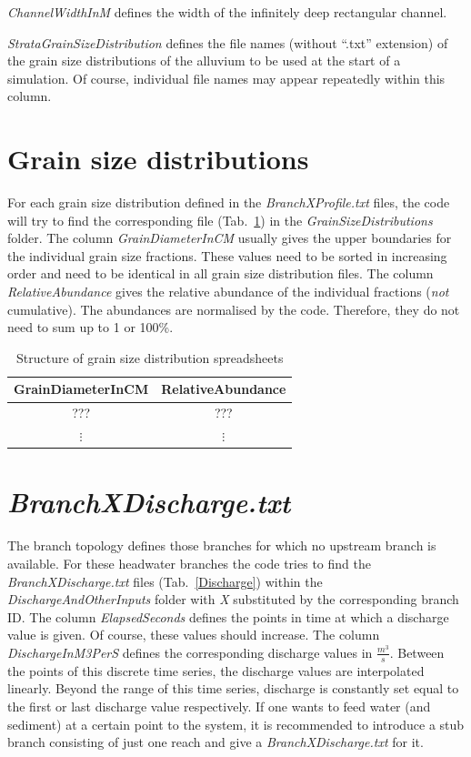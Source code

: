 \documentclass[11pt,a4paper]{article}
\begin{document}
\emph{ChannelWidthInM} defines the width of the infinitely deep rectangular channel.

\emph{StrataGrainSizeDistribution} defines the file names (without ``.txt'' extension) of the grain size distributions of the alluvium to be used at the start of a simulation. Of course, individual file names may appear repeatedly within this column.

\section{Grain size distributions}\label{GrainSizeDistributions}
For each grain size distribution defined in the \emph{BranchXProfile.txt} files, the code will try to find the corresponding file (Tab.~\ref{GSD}) in the \emph{GrainSizeDistributions} folder. The column \emph{GrainDiameterInCM} usually gives the upper boundaries for the individual grain size fractions. These values need to be sorted in increasing order and need to be identical in all grain size distribution files. The column \emph{RelativeAbundance} gives the relative abundance of the individual fractions (\emph{not} cumulative). The abundances are normalised by the code. Therefore, they do not need to sum up to 1 or 100\%{}.

\begin{table}[h]
\caption{Structure of grain size distribution spreadsheets}
\label{GSD}
\vskip4mm
\centering
\begin{tabular}{c|c}
\hline\hline
GrainDiameterInCM & RelativeAbundance\\
\hline
??? & ???\\
\hline
$\vdots$ & $\vdots$\\
\hline\hline
\end{tabular}
\end{table}

\section{\mbox{\emph{BranchXDischarge.txt}}}\label{BranchXDischarge}
The branch topology defines those branches for which no upstream branch is available. For these headwater branches the code tries to find the \mbox{\emph{BranchX}\-\emph{Discharge.txt}} files (Tab.~\ref{Discharge}) within the \emph{DischargeAndOtherInputs} folder with \emph{X} substituted by the corresponding branch ID. The column \emph{ElapsedSeconds} defines the points in time at which a discharge value is given. Of course, these values should increase. The column \emph{DischargeInM3PerS} defines the corresponding discharge values in $\frac{m^3}{s}$. Between the points of this discrete time series, the discharge values are interpolated linearly. Beyond the range of this time series, discharge is constantly set equal to the first or last discharge value respectively. If one wants to feed water (and sediment) at a certain point to the system, it is recommended to introduce a stub branch consisting of just one reach and give a \mbox{\emph{BranchXDischarge.txt}} for it.
\end{document}

